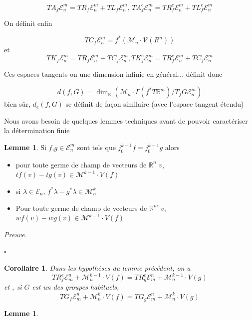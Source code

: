 \documentclass[a4paper,12pt,oneside,titlepage]{article}
\newcommand{\rightane}[3]{TR_{#1}^e\mathcal{E}^{#2}_{#3}}
\newcommand{\gentan}[3]{TG_{#1}\mathcal{E}^{#2}_{#3}}
\newcommand{\R}[0]{\mathbb{R}}
\theoremstyle{definition}
\newtheorem{lemme}[definition]{Lemme}
\theoremstyle{plain}
\newtheorem{corollaire}[definition]{Corollaire}
\newenvironment{preuve}
{\par\noindent\textit{Preuve.}\ }
{\hfill$\square$\par}
\begin{document}
\begin{equation*}
    TA_f\mathcal{E}^m_n =TR_f\mathcal{E}_n^m +TL_f\mathcal{E}_n^m  \text{,   }
    TA^e_f\mathcal{E}_n^m  = TR^e_f\mathcal{E}_n^m +TL^e_f\mathcal{E}_n^m
\end{equation*}


On définit enfin 

\begin{equation*}
    TC_f \mathcal{E}^m_n= f^*(\mathcal{M}_n\cdot \mathcal{V}(R^n))
\end{equation*}
et 
\begin{equation*}
    TK_f \mathcal{E}^m_n= TR_f \mathcal{E}^m_n+ TC_f\mathcal{E}^m_n, 
    TK^e_f \mathcal{E}^m_n= TR^e_f \mathcal{E}^m_n+ TC_f\mathcal{E}^m_n
\end{equation*}

Ces espaces tangents on une dimension infinie en général... définit donc 

\begin{equation*}
    d(f,G)=\dim_\R(\mathcal{M}_n\cdot \Gamma(f^*T\R^m)/T _fG\mathcal{E}^m_n)
\end{equation*}
bien sûr, $d_e(f,G)$ se définit de façon similaire (avec l'espace tangent étendu)

Nous avons besoin de quelques lemmes techniques avant de pouvoir caractériser la détermination finie
\begin{lemme}
    Si $f$,$g\in\mathcal{E}_n^m$ sont tels que $j^{k-1}_0f=j^{k-1}_0g$ alors
    \begin{itemize}
        \item pour toute germe de champ de vecteurs  de $\R^n$ $v$, $tf(v)-tg(v)\in \mathcal{M}^{k-1}\cdot V(f)$
        \item si $\lambda\in\mathcal{E}_n$, $f^*\lambda-g^{*}\lambda\in\mathcal{M}^k_n$
        \item Pour toute germe de champ de vecteurs  de $\R^m$ $v$, $wf(v)-wg(v)\in \mathcal{M}^{k-1}\cdot V(f)$
    \end{itemize}
\end{lemme}
\begin{preuve}
    
\end{preuve}

\begin{corollaire}
Dans les hypothèses du lemme précédent, on a 
\begin{equation*}
    \rightane{f}{n}{m}+\mathcal{M}^{k-1}_n\cdot V(f)=\rightane{g}{n}{m}+\mathcal{M}^{k-1}_n\cdot V(g)
\end{equation*}
et , si $G$ est un des groupes habituels,
\begin{equation*}
        \gentan{f}{n}{m}+\mathcal{M}^{k}_n\cdot V(f)=\gentan{g}{n}{m}+\mathcal{M}^{k}_n\cdot V(g)
\end{equation*}
\end{corollaire}
\begin{lemme}
    
\end{lemme}
\end{document}
